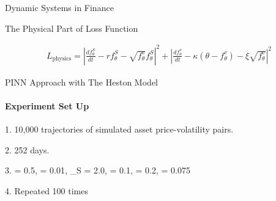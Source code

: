 \begin{frame}{Dynamic Systems in Finance}

    \begin{block}{The Physical Part of Loss Function}
    
        \begin{equation}
            \begin{align}
                L_{\text{physics}} = \left| \frac{d f_{\theta}^S}{dt} - r f_{\theta}^S - \sqrt{f_{\theta}^v} f_{\theta}^S \right|^2 + \left| \frac{d f_{\theta}^v}{dt} - \kappa (\theta - f_{\theta}^v) - \xi \sqrt{f_{\theta}^v} \right|^2
            \end{align}
        \end{equation}
    \end{block}
\end{frame}

\begin{frame}{PINN Approach with The Heston Model}
\framesubtitle{Experiment Set Up}
    1. 10,000 trajectories of simulated asset price-volatility pairs.
    
    2. 252 days.

    3. {\rho} = 0.5, {\mu} = 0.01, {\sigma_S} = 2.0, {\xi} = 0.1, {\theta} = 0.2, {\kappa} = 0.075

    4. Repeated 100 times
    
    
\end{frame}

